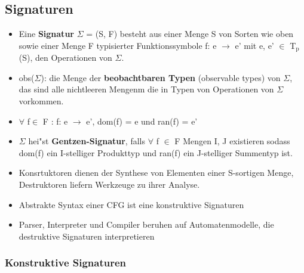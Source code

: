 \documentclass[11pt]{article}
\begin{document}
\subsection{Signaturen}
\label{sec-2-5}

\begin{itemize}
\item Eine \textbf{Signatur} $\Sigma$ = (S, F) besteht aus einer Menge S von Sorten wie oben sowie einer Menge F typisierter Funktionssymbole f: e $\to$ e' mit e, e' $\in$ T$_{\text{p}}$(S), den Operationen von $\Sigma$.
\item obs($\Sigma$): die Menge der \textbf{beobachtbaren Typen} (observable types) von $\Sigma$, das sind alle nichtleeren Mengenm die in Typen von Operationen von $\Sigma$ vorkommen.
\item $\forall$ f$\in$ F : f: e $\to$ e', dom(f) = e und ran(f) = e'
\item $\Sigma$ hei"st \textbf{Gentzen-Signatur}, falls $\forall$ f $\in$ F Mengen I, J existieren sodass dom(f) ein I-stelliger Produkttyp und ran(f) ein J-stelliger Summentyp ist.
\item Konsrtuktoren dienen der Synthese von Elementen einer S-sortigen Menge, Destruktoren liefern Werkzeuge zu ihrer Analyse.
\item Abstrakte Syntax einer CFG ist eine konstruktive Signaturen
\item Parser, Interpreter und Compiler beruhen auf Automatenmodelle, die destruktive Signaturen interpretieren
\end{itemize}

\subsubsection{Konstruktive Signaturen}
\label{sec-2-5-1}
\end{document}
